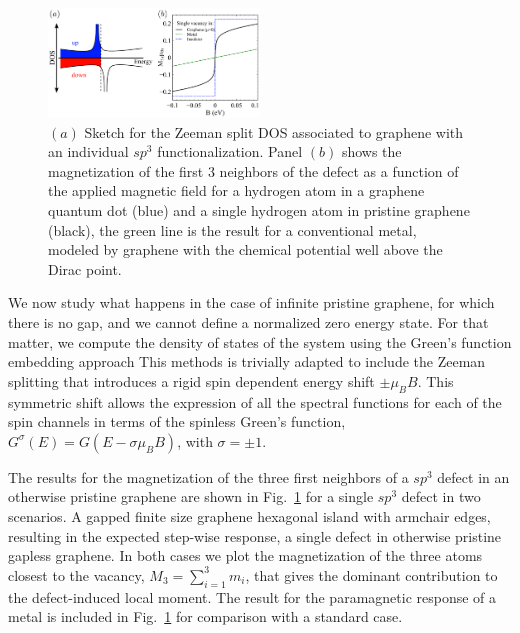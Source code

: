 \documentclass[aps,prb,twocolumn,superscriptaddress]{revtex4-1}
\begin{document}
\begin{figure}[t!]
  \centering
  \includegraphics[width=0.5\textwidth]{comparison.pdf}
  \caption{$(a)$ Sketch for the Zeeman split  DOS associated to  graphene with an individual $sp^3$ functionalization. Panel $(b)$ shows the magnetization of the first 3 neighbors of the defect as a function of the applied magnetic field for a hydrogen atom in a graphene quantum dot (blue) and a single hydrogen atom in pristine graphene (black), the green line is the result for a conventional metal, modeled by graphene with the chemical potential well above the Dirac point.}
  \label{mb}
\end{figure}
We now study what happens in the case of infinite pristine graphene, for which there is no gap, and we cannot define a normalized zero energy state. For that matter, we compute the density of states of the system using the Green's function embedding approach %
This methods is trivially adapted to include the Zeeman splitting that introduces a rigid spin dependent energy shift $\pm\mu_B B$. This symmetric shift allows the expression of all the spectral functions for each of the spin channels in terms of the spinless Green's function, $G^\sigma(E)=G(E-\sigma \mu_BB)$, with $\sigma= \pm 1$.


The results for the magnetization of the three first neighbors of a $sp^3$ defect in an otherwise pristine graphene are shown in Fig.~\ref{mb} for a single $sp^3$ defect in two scenarios. A gapped finite size graphene hexagonal island with armchair edges, resulting in the expected step-wise response, a single defect in otherwise pristine gapless graphene.
In both cases we plot  the magnetization of the three atoms closest to the vacancy,
$M_3=\sum^3_{i=1}m_i$, that gives the dominant contribution to the
defect-induced local moment. {The result for the paramagnetic response of a
metal is included in Fig.~\ref{mb} for comparison with a standard case}.
\end{document}
